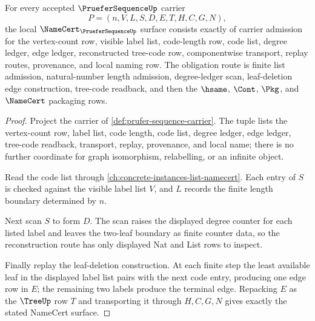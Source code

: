\begin{theorem}
\label{thm:prufer-sequence-namecert-obligations}
For every accepted $\PrueferSequenceUp$ carrier
$$
P=(n,V,L,S,D,E,T,H,C,G,N),
$$
the local $\NameCert_{\PrueferSequenceUp}$ surface consists exactly of carrier admission for the vertex-count row, visible label list, code-length row, code list, degree ledger, edge ledger, reconstructed tree-code row, componentwise transport, replay routes, provenance, and local naming row. The obligation route is finite list admission, natural-number length admission, degree-ledger scan, leaf-deletion edge construction, tree-code readback, and then the $\hsame$, $\Cont$, $\Pkg$, and $\NameCert$ packaging rows.
\end{theorem}
\begin{proof}
Project the carrier of \autoref{def:prufer-sequence-carrier}. The tuple lists the vertex-count row, label list, code length, code list, degree ledger, edge ledger, tree-code readback, transport, replay, provenance, and local name; there is no further coordinate for graph isomorphism, relabelling, or an infinite object.

Read the code list through \autoref{ch:concrete-instances-list-namecert}. Each entry of $S$ is checked against the visible label list $V$, and $L$ records the finite length boundary determined by $n$.

Next scan $S$ to form $D$. The scan raises the displayed degree counter for each listed label and leaves the two-leaf boundary as finite counter data, so the reconstruction route has only displayed Nat and List rows to inspect.

Finally replay the leaf-deletion construction. At each finite step the least available leaf in the displayed label list pairs with the next code entry, producing one edge row in $E$; the remaining two labels produce the terminal edge. Repacking $E$ as the $\TreeUp$ row $T$ and transporting it through $H,C,G,N$ gives exactly the stated NameCert surface.
\end{proof}

